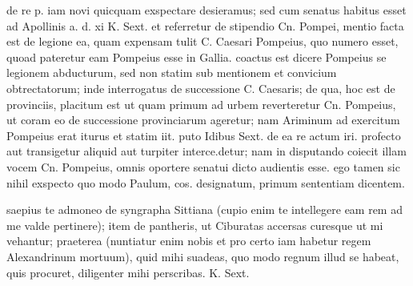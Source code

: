  de re p. iam novi quicquam exspectare desieramus; sed cum senatus habitus esset ad Apollinis a. d. xi K. Sext. et referretur de stipendio Cn. Pompei, mentio facta est de legione ea, quam expensam tulit C. Caesari Pompeius, quo numero esset, quoad pateretur eam Pompeius esse in Gallia. coactus est dicere Pompeius se legionem abducturum, sed non statim sub mentionem et convicium obtrectatorum; inde interrogatus de successione C. Caesaris; de qua, hoc est de provinciis, placitum est ut quam primum ad urbem reverteretur Cn. Pompeius, ut coram eo de successione provinciarum ageretur; nam Ariminum ad exercitum Pompeius erat iturus et statim iit. puto Idibus Sext. de ea re actum iri. profecto aut transigetur aliquid aut turpiter interce.detur; nam in disputando coiecit illam vocem Cn. Pompeius, omnis oportere senatui dicto audientis esse. ego tamen sic nihil exspecto quo modo Paulum, cos. designatum, primum sententiam dicentem.

 saepius te admoneo de syngrapha Sittiana (cupio enim te intellegere eam rem ad me valde pertinere); item de pantheris, ut Ciburatas accersas curesque ut mi vehantur; praeterea (nuntiatur enim nobis et pro certo iam habetur regem Alexandrinum mortuum), quid mihi suadeas, quo modo regnum illud se habeat, quis procuret, diligenter mihi perscribas. K. Sext.
